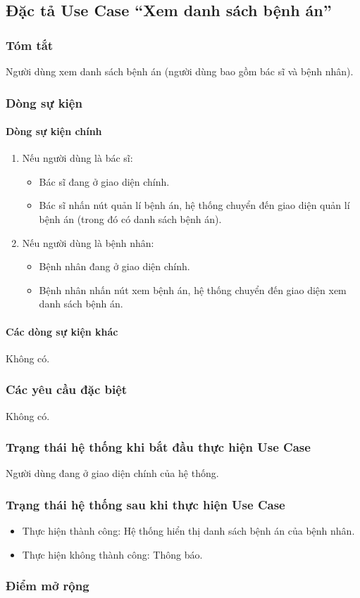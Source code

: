 \subsection{Đặc tả Use Case ``Xem danh sách bệnh án''}

\subsubsection{Tóm tắt}
Người dùng xem danh sách bệnh án (người dùng bao gồm bác sĩ và bệnh nhân).

\subsubsection{Dòng sự kiện}
\paragraph{\textbf{Dòng sự kiện chính}}
\begin{enumerate}
  \item Nếu người dùng là bác sĩ:
    \begin{itemize}
      \item Bác sĩ đang ở giao diện chính.
      \item Bác sĩ nhấn nút quản lí bệnh án, hệ thống chuyển đến giao diện quản lí bệnh án (trong đó có danh sách bệnh án).
    \end{itemize}
  \item Nếu người dùng là bệnh nhân:
    \begin{itemize}
      \item Bệnh nhân đang ở giao diện chính.
      \item Bệnh nhân nhấn nút xem bệnh án, hệ thống chuyển đến giao diện xem danh sách bệnh án.
    \end{itemize}
\end{enumerate}

\paragraph{\textbf{Các dòng sự kiện khác}}
Không có.

\subsubsection{Các yêu cầu đặc biệt}
Không có.

\subsubsection{Trạng thái hệ thống khi bắt đầu thực hiện Use Case}
Người dùng đang ở giao diện chính của hệ thống.

\subsubsection{Trạng thái hệ thống sau khi thực hiện Use Case}
\begin{itemize}
  \item Thực hiện thành công: Hệ thống hiển thị danh sách bệnh án của bệnh nhân.
  \item Thực hiện không thành công: Thông báo.
\end{itemize}

\subsubsection{Điểm mở rộng}